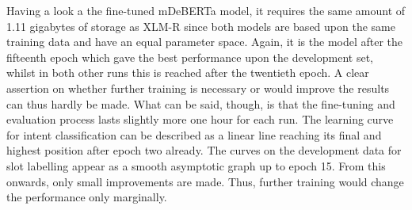 \documentclass[11pt,a4paper,twoside,openright]{scrbook}
\begin{document}
Having a look a the fine-tuned mDeBERTa model, it requires the same amount of 1.11 gigabytes of storage as XLM-R since both models are based upon the same training data and have an equal parameter space. Again, it is the model after the fifteenth epoch which gave the best performance upon the development set, whilst in both other runs this is reached after the twentieth epoch. A clear assertion on whether further training is necessary or would improve the results can thus hardly be made. What can be said, though, is that the fine-tuning and evaluation process lasts slightly more one hour for each run. The learning curve for intent classification can be described as a linear line reaching its final and highest position after epoch two already. The curves on the development data for slot labelling appear as a smooth asymptotic graph up to epoch 15. From this onwards, only small improvements are made. Thus, further training would change the performance only marginally.

\begin{table}[!ht]
\centering
{}
\caption{Baseline results for mDeBERTa according to the original xSID languages over three random seeds, Avg. = average on languages without English, sd = standard deviation}
\label{tab:Baseline_mDeBERTa_base}
\end{table}
\end{document}
